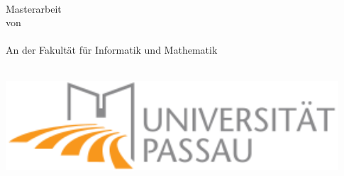 
\begin{titlepage}

	\vspace*{3.75cm}
	\begin{center}
		\Huge{\mytitle}
		\vspace*{2.25cm}\\
		\Large{
												  {Masterarbeit\\von}
		}\\
		\vspace*{1cm}
		\huge{\myname}\\
		\vspace*{1cm}
		\Large{
													{An der Fakult\"at f\"ur Informatik und Mathematik}
			\\
			\myinstitute\\
                      }
	\end{center}
        \begin{center}
        \includegraphics[]{logos/UPLogo.pdf}
      \end{center}


\end{titlepage}
